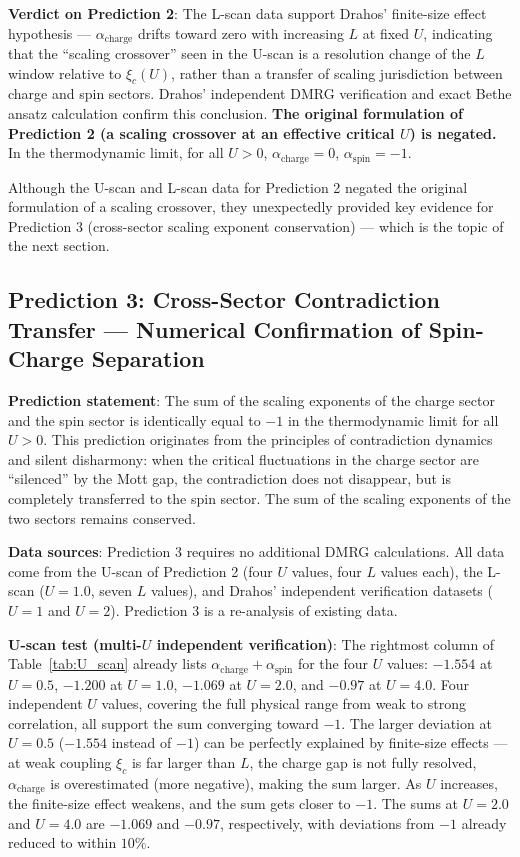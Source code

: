 \documentclass[prb,reprint,twocolumn,superscriptaddress]{revtex4-2}
\begin{document}
\textbf{Verdict on Prediction 2}: The L-scan data support Drahos' finite-size effect hypothesis --- $\alpha_{\mathrm{charge}}$ drifts toward zero with increasing $L$ at fixed $U$, indicating that the ``scaling crossover'' seen in the U-scan is a resolution change of the $L$ window relative to $\xi_c(U)$, rather than a transfer of scaling jurisdiction between charge and spin sectors. Drahos' independent DMRG verification and exact Bethe ansatz calculation confirm this conclusion. \textbf{The original formulation of Prediction 2 (a scaling crossover at an effective critical $U$) is negated.} In the thermodynamic limit, for all $U > 0$, $\alpha_{\mathrm{charge}} = 0$, $\alpha_{\mathrm{spin}} = -1$.

Although the U-scan and L-scan data for Prediction 2 negated the original formulation of a scaling crossover, they unexpectedly provided key evidence for Prediction 3 (cross-sector scaling exponent conservation) --- which is the topic of the next section.

\subsection{Prediction 3: Cross-Sector Contradiction Transfer --- Numerical Confirmation of Spin-Charge Separation}

\textbf{Prediction statement}: The sum of the scaling exponents of the charge sector and the spin sector is identically equal to $-1$ in the thermodynamic limit for all $U > 0$. This prediction originates from the principles of contradiction dynamics and silent disharmony: when the critical fluctuations in the charge sector are ``silenced'' by the Mott gap, the contradiction does not disappear, but is completely transferred to the spin sector. The sum of the scaling exponents of the two sectors remains conserved.

\textbf{Data sources}: Prediction 3 requires no additional DMRG calculations. All data come from the U-scan of Prediction 2 (four $U$ values, four $L$ values each), the L-scan ($U = 1.0$, seven $L$ values), and Drahos' independent verification datasets ($U=1$ and $U=2$). Prediction 3 is a re-analysis of existing data.

\textbf{U-scan test (multi-$U$ independent verification)}: The rightmost column of Table~\ref{tab:U_scan} already lists $\alpha_{\mathrm{charge}} + \alpha_{\mathrm{spin}}$ for the four $U$ values: $-1.554$ at $U = 0.5$, $-1.200$ at $U = 1.0$, $-1.069$ at $U = 2.0$, and $-0.97$ at $U = 4.0$. Four independent $U$ values, covering the full physical range from weak to strong correlation, all support the sum converging toward $-1$. The larger deviation at $U = 0.5$ ($-1.554$ instead of $-1$) can be perfectly explained by finite-size effects --- at weak coupling $\xi_c$ is far larger than $L$, the charge gap is not fully resolved, $\alpha_{\mathrm{charge}}$ is overestimated (more negative), making the sum larger. As $U$ increases, the finite-size effect weakens, and the sum gets closer to $-1$. The sums at $U = 2.0$ and $U = 4.0$ are $-1.069$ and $-0.97$, respectively, with deviations from $-1$ already reduced to within $10\%$.
\end{document}
